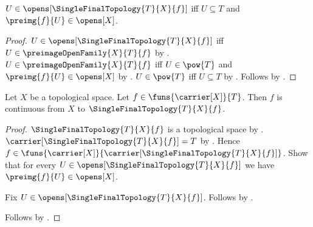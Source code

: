 \begin{proposition}\label{single_final_topology_open_iff}
    $U\in\opens[\SingleFinalTopology{T}{X}{f}]$ iff
        $U\subseteq T$ and $\preimg{f}{U}\in\opens[X]$.
\end{proposition}
\begin{proof}
    $U\in\opens[\SingleFinalTopology{T}{X}{f}]$ iff
        $U\in\preimageOpenFamily{X}{T}{f}$ by
        .
    $U\in\preimageOpenFamily{X}{T}{f}$ iff
        $U\in\pow{T}$ and $\preimg{f}{U}\in\opens[X]$ by
        .
    $U\in\pow{T}$ iff $U\subseteq T$ by .
    Follows by \auto.
\end{proof}

\begin{theorem}\label{single_final_topology_structure_map_continuous}
    Let $X$ be a topological space.
    Let $f\in\funs{\carrier[X]}{T}$.
    Then $f$ is continuous from $X$ to
        $\SingleFinalTopology{T}{X}{f}$.
\end{theorem}
\begin{proof}
    $\SingleFinalTopology{T}{X}{f}$ is a topological space by
        .
    $\carrier[\SingleFinalTopology{T}{X}{f}]=T$ by
        .
    Hence $f\in\funs{\carrier[X]}{
        \carrier[\SingleFinalTopology{T}{X}{f}]}$.
    Show that for every
        $U\in\opens[\SingleFinalTopology{T}{X}{f}]$ we have
        $\preimg{f}{U}\in\opens[X]$.
    \begin{subproof}
        Fix $U\in\opens[\SingleFinalTopology{T}{X}{f}]$.
        Follows by .
    \end{subproof}
    Follows by .
\end{proof}

